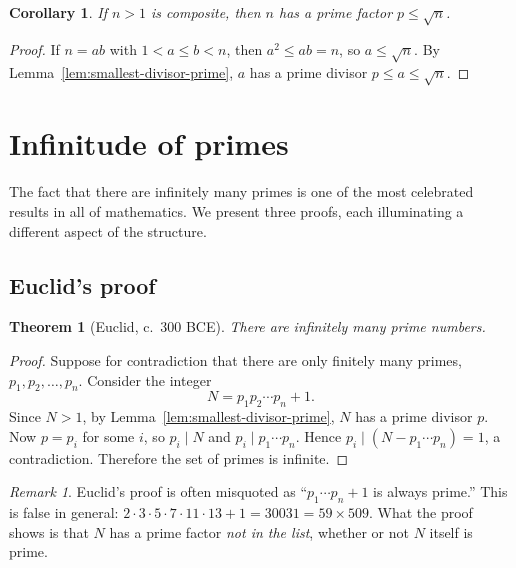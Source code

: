 \documentclass[12pt,a4paper,openany]{book}
\theoremstyle{definition}
\theoremstyle{plain}
\newtheorem{theorem}[definition]{Theorem}
\newtheorem{corollary}[definition]{Corollary}
\theoremstyle{remark}
\newtheorem{remark}[definition]{Remark}
\begin{document}
\begin{corollary}
\label{cor:composite-small-factor}
If $n > 1$ is composite, then $n$ has a prime factor $p \le \sqrt{n}$.
\end{corollary}

\begin{proof}
If $n = ab$ with $1 < a \le b < n$, then $a^2 \le ab = n$, so $a \le \sqrt{n}$.
By Lemma~\ref{lem:smallest-divisor-prime}, $a$ has a prime divisor $p \le a \le \sqrt{n}$.
\end{proof}

\section{Infinitude of primes}
\label{sec:infinitude}

The fact that there are infinitely many primes is one of the most celebrated
results in all of mathematics. We present three proofs, each illuminating a
different aspect of the structure.

\subsection{Euclid's proof}
\label{subsec:euclid-proof}

\begin{theorem}[Euclid, c.~300 BCE]
\label{thm:euclid-infinitude}
There are infinitely many prime numbers.
\end{theorem}

\begin{proof}
Suppose for contradiction that there are only finitely many primes,
$p_1, p_2, \ldots, p_n$. Consider the integer
\[
  N = p_1 p_2 \cdots p_n + 1.
\]
Since $N > 1$, by Lemma~\ref{lem:smallest-divisor-prime}, $N$ has a prime
divisor $p$. Now $p = p_i$ for some $i$, so $p_i \mid N$ and
$p_i \mid p_1 \cdots p_n$. Hence $p_i \mid (N - p_1 \cdots p_n) = 1$,
a contradiction. Therefore the set of primes is infinite.
\end{proof}

\begin{remark}
\label{rem:euclid-constructive}
Euclid's proof is often misquoted as ``$p_1 \cdots p_n + 1$ is always prime.''
This is false in general: $2 \cdot 3 \cdot 5 \cdot 7 \cdot 11 \cdot 13 + 1 = 30031 = 59 \times 509$.
What the proof shows is that $N$ has a prime factor \emph{not in the list},
whether or not $N$ itself is prime.
\end{remark}
\end{document}
